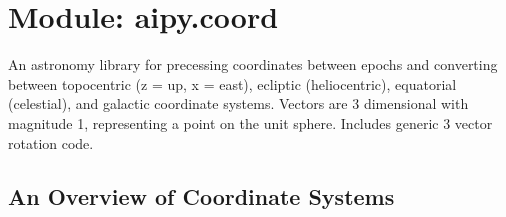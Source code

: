 \section{Module: aipy.coord}

An astronomy library for precessing coordinates between epochs and converting 
between topocentric (z = up, x = east), ecliptic (heliocentric), equatorial
(celestial), and galactic coordinate systems.  Vectors are 3 dimensional 
with magnitude 1, representing a point on the unit sphere.  Includes generic 
3 vector rotation code.

\subsection{An Overview of Coordinate Systems}

